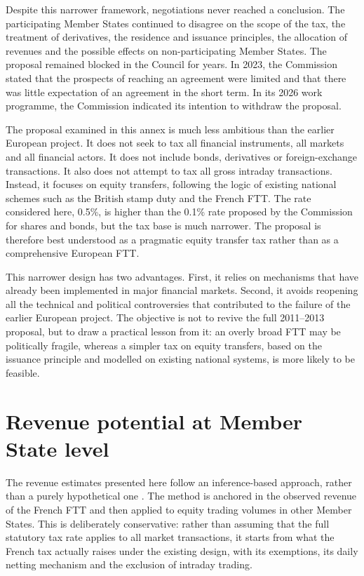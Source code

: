 \documentclass[../main]{subfiles}
\begin{document}
Despite this narrower framework, negotiations never reached a conclusion. The participating Member States continued to disagree on the scope of the tax, the treatment of derivatives, the residence and issuance principles, the allocation of revenues and the possible effects on non-participating Member States. The proposal remained blocked in the Council for years. In 2023, the Commission stated that the prospects of reaching an agreement were limited and that there was little expectation of an agreement in the short term. In its 2026 work programme, the Commission indicated its intention to withdraw the proposal.

The proposal examined in this annex is much less ambitious than the earlier European project. It does not seek to tax all financial instruments, all markets and all financial actors. It does not include bonds, derivatives or foreign-exchange transactions. It also does not attempt to tax all gross intraday transactions. Instead, it focuses on equity transfers, following the logic of existing national schemes such as the British stamp duty and the French FTT. The rate considered here, 0.5\%, is higher than the 0.1\% rate proposed by the Commission for shares and bonds, but the tax base is much narrower. The proposal is therefore best understood as a pragmatic equity transfer tax rather than as a comprehensive European FTT.

This narrower design has two advantages. First, it relies on mechanisms that have already been implemented in major financial markets. Second, it avoids reopening all the technical and political controversies that contributed to the failure of the earlier European project. The objective is not to revive the full 2011--2013 proposal, but to draw a practical lesson from it: an overly broad FTT may be politically fragile, whereas a simpler tax on equity transfers, based on the issuance principle and modelled on existing national systems, is more likely to be feasible.

\section{Revenue potential at Member State level}

The revenue estimates presented here follow an inference-based approach, rather than a purely hypothetical one \citep{CapelleBlancardPersaud2025}. The method is anchored in the observed revenue of the French FTT and then applied to equity trading volumes in other Member States. This is deliberately conservative: rather than assuming that the full statutory tax rate applies to all market transactions, it starts from what the French tax actually raises under the existing design, with its exemptions, its daily netting mechanism and the exclusion of intraday trading.
\end{document}
